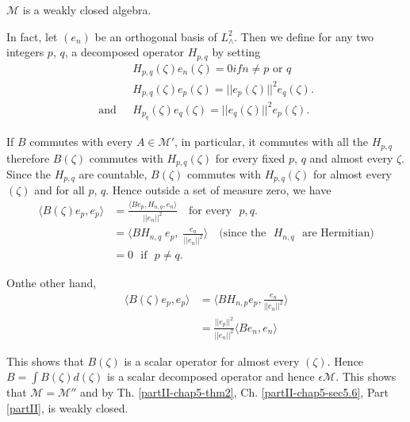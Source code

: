 \begin{thm}\label{partIII-chap1-thm3}
$\mathscr{M}$ is a weakly closed algebra.
\end{thm}

In fact, let $(e_n)$ be an orthogonal basis of $L^{2}_{\wedge}$. Then
we define for any two integers $p$, $q$, a decomposed operator $H_{p,q}$
by setting 
\begin{align*}
& H_{p,q}(\zeta)e_n(\zeta)=0 if n \neq p \text { or }  q\\
& H_{p,q}(\zeta)e_p(\zeta)=|| e_p(\zeta) ||^{2}e_q(\zeta).\\
\text{and~ } & H_{p_q}(\zeta) e_q(\zeta)= || e_q(\zeta)||^{2}e_p(\zeta).
\end{align*}

If $B$ commutes with every $A\in \mathscr{M}'$, in particular, it
commutes with all 
the $H_{p,q}$ therefore $B(\zeta)$ commutes with $H_{p,q}(\zeta)$ for
every fixed $p$, $q$ and almost every $\zeta$. Since the $H_{p,q}$ are
countable, $B(\zeta)$ commutes with $H_{p,q}(\zeta)$ for almost every
$(\zeta)$ and for all $p$, $q$. Hence outside a set of measure zero, we
have 
\begin{align*}
\langle B(\zeta)e_p, e_p \rangle &= \frac {\langle Be_p,H_{n,q},e_n
  \rangle }{|| e_n ||^2}\quad \text{for every~ } p,q.\\ 
&=\langle BH_{n,q} \; e_p, \; \frac{e_n}{|| e_n||^2}\rangle\quad \text{(since
the~ } H_{n,q} \text{~ are Hermitian)}\\ 
&=0 \text{~ if~ } p \neq q. 
\end{align*}

On\pageoriginale the other hand,
\begin{align*}
\langle B(\zeta)e_p,e_p\rangle &= \langle
BH_{n,p}e_p,\frac{e_n}{|| e_n||^2}\rangle\\ 
&=\frac{|| e_p||^2}{|| e_n ||^2}\langle Be_n,e_n\rangle 
\end{align*}

This shows that $B(\zeta)$ is a scalar operator for almost every
$(\zeta)$. Hence $B=\int B(\zeta)d(\zeta)$ is a scalar decomposed
operator and hence $\epsilon \mathscr{M}$. This shows that
$\mathscr{M}=\mathscr{M}''$ and by Th. \ref{partII-chap5-thm2},
Ch. \ref{partII-chap5-sec5.6}, Part \ref{partII}, is weakly closed.  

